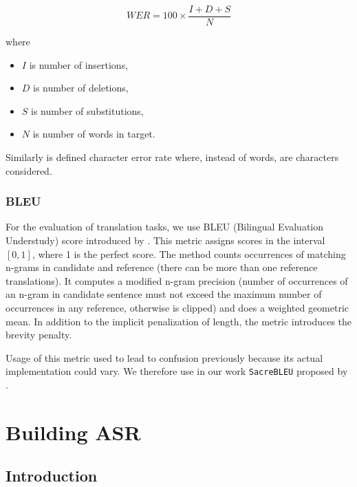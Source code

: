 \begin{equation}
WER = 100 \times \frac{I + D + S}{N}
\end{equation}

where

\begin{itemize}
	\item $I$ is number of insertions,
	\item $D$ is number of deletions,
	\item $S$ is number of substitutions,
	\item $N$ is number of words in target.
\end{itemize}

Similarly is defined character error rate where, instead of words, are characters considered.

\subsection{BLEU}
For the evaluation of translation tasks, we use BLEU (Bilingual Evaluation Understudy) score introduced by . This metric assigns scores in the interval $[0,1]$, where 1 is the perfect score. The method counts occurrences of matching n-grams in candidate and reference (there can be more than one reference translations). It computes a modified n-gram precision (number of occurrences of an n-gram in candidate sentence must not exceed the maximum number of occurrences in any reference, otherwise is clipped) and does a weighted geometric mean. In addition to the implicit penalization of length, the metric introduces the brevity penalty.

Usage of this metric used to lead to confusion previously because its actual implementation could vary. We therefore use in our work \texttt{SacreBLEU} proposed by .


\chapter{Building ASR}
\label{chapter:asr}


\section{Introduction}


